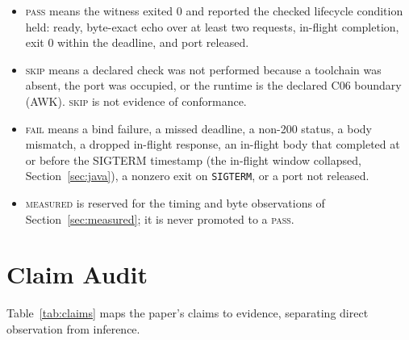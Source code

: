 \documentclass[11pt,letterpaper]{article}
\newcommand{\measured}{\textsc{measured}}
\begin{document}
\begin{itemize}
  \item \textsc{pass} means the witness exited 0 and reported the checked
        lifecycle condition held: ready, byte-exact echo over at least
        two requests, in-flight completion, exit 0 within the deadline,
        and port released.
  \item \textsc{skip} means a declared check was not performed because a
        toolchain was absent, the port was occupied, or the runtime is
        the declared C06 boundary (AWK). \textsc{skip} is not evidence of
        conformance.
  \item \textsc{fail} means a bind failure, a missed deadline, a non-200
        status, a body mismatch, a dropped in-flight response, an in-flight
        body that completed at or before the SIGTERM timestamp (the in-flight
        window collapsed, Section~\ref{sec:java}), a nonzero exit on
        \texttt{SIGTERM}, or a port not released.
  \item \measured{} is reserved for the timing and byte observations of
        Section~\ref{sec:measured}; it is never promoted to a
        \textsc{pass}.
\end{itemize}

\section{Claim Audit}

Table~\ref{tab:claims} maps the paper's claims to evidence, separating
direct observation from inference.
\end{document}
